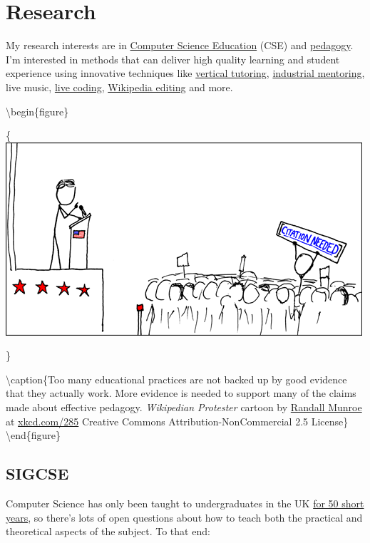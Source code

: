 \documentclass[12pt,]{book}
\begin{document}
\hypertarget{research}{%
\chapter{Research}\label{research}}

My research interests are in \href{https://scholar.google.com/citations?view_op=search_authors\&hl=en\&mauthors=label:computer_science_education}{Computer Science Education} (CSE) and \href{https://en.wikipedia.org/wiki/Pedagogy}{pedagogy}. I'm interested in methods that can deliver high quality learning and student experience using innovative techniques like \protect\hyperlink{vertical-tutoring-1}{vertical tutoring}, \href{https://www.cs.manchester.ac.uk/connect/business-engagement/industrial-mentoring/}{industrial mentoring}, live music, \href{https://en.wikipedia.org/wiki/Live_coding}{live coding}, \protect\hyperlink{wikipedia}{Wikipedia editing} and more.

\textbackslash{}begin\{figure\}

\{\centering \includegraphics[width=0.7\linewidth]{images/wikipedian_protester}

\}

\textbackslash{}caption\{Too many educational practices are not backed up by good evidence that they actually work. More evidence is needed to support many of the claims made about effective pedagogy. \emph{Wikipedian Protester} cartoon by \href{https://en.wikipedia.org/wiki/Randall_Munroe}{Randall Munroe} at \href{https://xkcd.com/285/}{xkcd.com/285} Creative Commons Attribution-NonCommercial 2.5 License\}\label{fig:unnamed-chunk-6}
\textbackslash{}end\{figure\}

\hypertarget{sigcse}{%
\section{SIGCSE}\label{sigcse}}

Computer Science has only been taught to undergraduates in the UK \href{http://www.bbc.co.uk/manchester/content/articles/2005/11/07/baby_computer_40_interview_feature.shtml}{for 50 short years}, so there's lots of open questions about how to teach both the practical and theoretical aspects of the subject. To that end:
\end{document}
